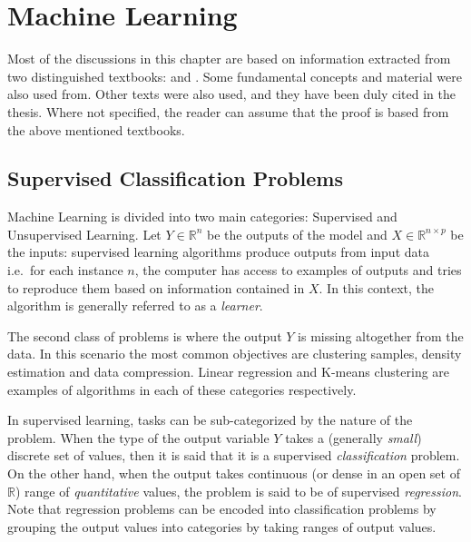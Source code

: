

\chapter{Machine Learning}
\label{ch:machineLearning}

Most of the discussions in this chapter are based on information extracted from two distinguished textbooks: \textcite{bishop-patternRecognition} and \textcite{hastie-elemstatslearn}. Some fundamental concepts and material were also used from\cite{scikit-learn}. Other texts were also used, and they have been duly cited in the thesis. Where not specified, the reader can assume that the proof is based from the above mentioned textbooks.


\section{Supervised Classification Problems}
\label{section-supervised-learning}


Machine Learning is divided into two main categories: Supervised and Unsupervised Learning. Let $Y \in \mathbb{R}^n$ be the outputs of the model and $X \in \mathbb{R}^{n \times p}$ be the inputs: supervised learning algorithms produce outputs from input data i.e.\ for each instance $n$, the computer has access to examples of outputs and tries to reproduce them based on information contained in $X$. In this context, the algorithm is generally referred to as a \textit{learner}.

The second class of problems is where the output $Y$ is missing altogether from the data. In this scenario the most common objectives are clustering samples, density estimation and data compression. Linear regression and K-means clustering are examples of algorithms in each of these categories respectively.


In supervised learning, tasks can be sub-categorized by the nature of the problem. When the type of the output variable $Y$ takes a (generally \textit{small}) discrete set of values, then it is said that it is a supervised \textit{classification} problem. On the other hand, when the output takes continuous (or dense in an open set of $\mathbb{R}$) range of \textit{quantitative} values, the problem is said to be of supervised \textit{regression}. Note that regression problems can be encoded into classification problems by grouping the output values into categories by taking ranges of output values.

